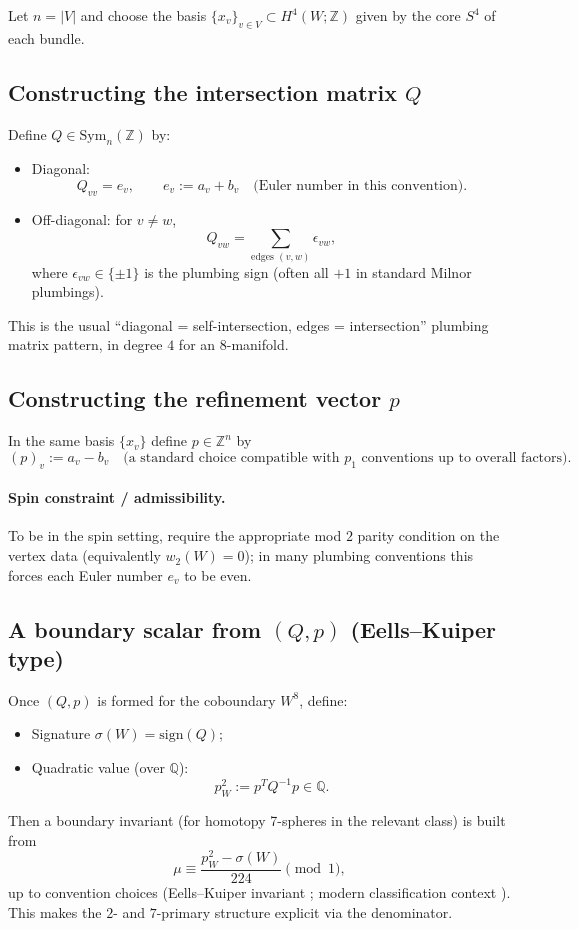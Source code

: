 \documentclass[11pt]{article}
\newcommand{\ZZ}{\mathbb{Z}}
\newcommand{\QQ}{\mathbb{Q}}
\newcommand{\Sym}{\mathrm{Sym}}
\newcommand{\sign}{\mathrm{sign}}
\begin{document}
Let $n=|V|$ and choose the basis $\{x_v\}_{v\in V}\subset H^4(W;\ZZ)$ given by the core $S^4$ of each bundle.

\subsection{Constructing the intersection matrix $Q$}
Define $Q\in \Sym_n(\ZZ)$ by:
\begin{itemize}
\item Diagonal:
\[
Q_{vv}=e_v,\qquad e_v:=a_v+b_v \quad \text{(Euler number in this convention).}
\]
\item Off-diagonal: for $v\neq w$,
\[
Q_{vw} = \sum_{\text{edges }(v,w)} \epsilon_{vw},
\]
where $\epsilon_{vw}\in\{\pm 1\}$ is the plumbing sign (often all $+1$ in standard Milnor plumbings).
\end{itemize}
This is the usual ``diagonal = self-intersection, edges = intersection'' plumbing matrix pattern, in degree $4$ for an 8-manifold.

\subsection{Constructing the refinement vector $p$}
In the same basis $\{x_v\}$ define $p\in \ZZ^n$ by
\[
(p)_v := a_v-b_v
\quad\text{(a standard choice compatible with $p_1$ conventions up to overall factors).}
\]
\paragraph{Spin constraint / admissibility.}
To be in the spin setting, require the appropriate mod $2$ parity condition on the vertex data (equivalently $w_2(W)=0$); in many plumbing conventions this forces each Euler number $e_v$ to be even.

\subsection{A boundary scalar from $(Q,p)$ (Eells--Kuiper type)}
Once $(Q,p)$ is formed for the coboundary $W^8$, define:
\begin{itemize}
\item Signature $\sigma(W)=\sign(Q)$;
\item Quadratic value (over $\QQ$):
\[
p_W^2 := p^T Q^{-1}p\in \QQ.
\]
\end{itemize}
Then a boundary invariant (for homotopy 7-spheres in the relevant class) is built from
\[
\mu \equiv \frac{p_W^2-\sigma(W)}{224}\pmod{1},
\]
up to convention choices (Eells--Kuiper invariant \cite{EK62}; modern classification context \cite{CN19}).
This makes the $2$- and $7$-primary structure explicit via the denominator.
\end{document}

